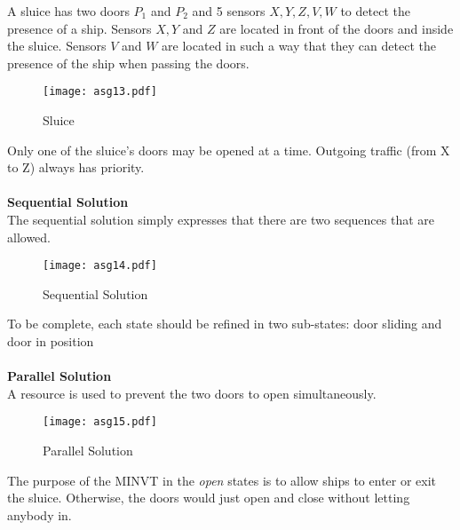 \documentclass[../main.tex]{subfiles}
\begin{document}
\begin{exmp}
A sluice has two doors $P_1$ and $P_2$ and 5 sensors $X,Y,Z,V,W$ to detect the presence of a ship. Sensors  $X, Y$ and $Z$ are located in front of the doors and inside the sluice. Sensors $V$ and $W$ are located in such a way that they can detect the presence of the ship when passing the doors.

\begin{figure}[H]
    \centering
    \texttt{[image: asg13.pdf]}
    \caption{Sluice}
    \label{asg13}
\end{figure}
Only one of the sluice's doors may be opened at a time. Outgoing traffic (from X to Z) always has priority.
\\\\
\textbf{Sequential Solution}\\
The sequential solution simply expresses that there are two sequences that are allowed.
\begin{figure}[H]
    \centering
    \texttt{[image: asg14.pdf]}
    \caption{Sequential Solution}
    \label{asg14}
\end{figure}
To be complete, each state should be refined in two sub-states: door sliding and door in position
\\\\
\textbf{Parallel Solution} \\
A resource is used to prevent the two doors to open simultaneously.
\begin{figure}[H]
    \centering
    \texttt{[image: asg15.pdf]}
    \caption{Parallel Solution}
    \label{asg15}
\end{figure}
The purpose of the MINVT in the \textit{open} states is to allow ships to enter or exit the sluice. Otherwise, the doors would just open and close without letting anybody in.
\end{exmp}
\end{document}
